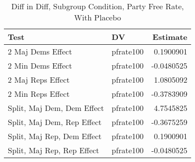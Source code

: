 \documentclass[12pt]{article}
\begin{document}
\begin{table}[ht]
	\centering
	\caption{Diff in Diff, Subgroup Condition, Party Free Rate, With Placebo}
	\begin{tabular}{llr}
		\hline
		Test & DV & Estimate \\ 
		\hline
		2 Maj Dems Effect & pfrate100 & 0.1900901 \\ 
		2 Min Dems Effect & pfrate100 & -0.0480525 \\ 
		\hline
		2 Maj Reps Effect & pfrate100 & 1.0805092 \\ 
		2 Min Reps Effect & pfrate100 & -0.3783909 \\ 
		\hline
		Split, Maj Dem, Dem Effect & pfrate100 & 4.7545825 \\ 
		Split, Maj Dem, Rep Effect & pfrate100 & -0.3675259 \\ 
		\hline
		Split, Maj Rep, Dem Effect & pfrate100 & 0.1900901 \\ 
		Split, Maj Rep, Rep Effect & pfrate100 & -0.0480525 \\ 
		\hline
	\end{tabular}
\end{table}
\end{document}
